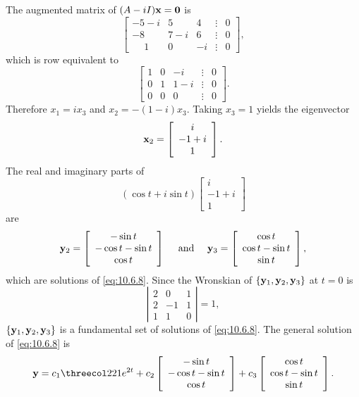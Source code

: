\begin{examplesolution}
The augmented matrix of $(A-iI){\bf x=0}$ is
\[
  \left[
  \begin{array}{ccrccc}
    -5-i         & 5   & 4  & \vdots & 0 \\
    -8           & 7-i & 6  & \vdots & 0 \\
    \phantom{-}1 & 0   & -i & \vdots & 0
  \end{array}\right],
\]
which is row equivalent to
\[
  \left[
  \begin{array}{ccccc}
    1 & 0 & -i  & \vdots & 0 \\
    0 & 1 & 1-i & \vdots & 0 \\
    0 & 0 & 0   & \vdots & 0
  \end{array}\right].
\]
Therefore $x_{1}=ix_{3}$ and $x_{2}=-(1-i)x_{3}$. Taking $x_{3}=1$ yields the eigenvector
\[
  {\bf x}_{2}=\left[
  \begin{array}{c}
    i    \\
    -1+i \\
    1
  \end{array}
  \right].
\]
The real and imaginary parts of
\[
  (\cos t+i\sin t)\left[
  \begin{array}{c}
    i    \\
    -1+i \\
    1
  \end{array}\right]
\]
are
\[
  {\bf y}_{2}= \left[
  \begin{array}{c}
    -\sin t        \\
    -\cos t-\sin t \\
    \cos t
  \end{array}\right] \quad\mbox{ and }\quad{\bf y}_{3}=\left[
  \begin{array}{c}
    \cos t        \\
    \cos t-\sin t \\
    \sin t
  \end{array}\right],
\]
which are solutions of \eqref{eq:10.6.8}. Since the Wronskian of
$\{{\bf y}_{1},{\bf y}_{2},{\bf y}_{3}\}$ at $t=0$ is
\[
  \left|
  \begin{array}{rrr}
    2 & 0  & 1 \\
    2 & -1 & 1 \\
    1 & 1  & 0
  \end{array}\right|=1,
\]
$\{{\bf y}_{1},{\bf y}_{2},{\bf y}_{3}\}$ is a fundamental set of solutions of \eqref{eq:10.6.8}.
The general solution of \eqref{eq:10.6.8} is
\[
  {\bf y}=c_{1}\threecol221e^{2t}+c_{2}\left[
  \begin{array}{c}
    -\sin t        \\
    -\cos t-\sin t \\
    \cos t
  \end{array}\right] +c_{3}\left[
  \begin{array}{c}
    \cos t        \\
    \cos t-\sin t \\
    \sin t
  \end{array}\right].
\]
\end{examplesolution}


